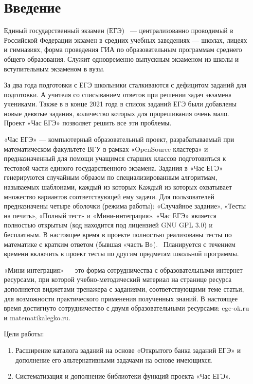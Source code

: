 
\section*{Введение}
Единый государственный экзамен (ЕГЭ)~\cite{ege} --- централизованно проводимый в Российской 
Федерации экзамен в средних учебных заведениях — школах, лицеях и гимназиях,
форма проведения ГИА по образовательным программам среднего общего образования.
Служит одновременно выпускным экзаменом из школы и вступительным экзаменом в вузы.

За два года подготовки с ЕГЭ школьники сталкиваются с дефицитом заданий для подготовки.
А учителя со списыванием ответов при решении задач экзамена учениками. 
Также в в конце 2021 года в список заданий ЕГЭ были добавлены новые девятые задания, 
количество которых для прорешивания очень мало. 
Проект «Час ЕГЭ» позволяет решить все эти проблемы.

«Час ЕГЭ» — компьютерный образовательный проект, разрабатываемый при математическом 
факультете ВГУ в рамках «OpenSource кластера» и предназначенный для помощи учащимся 
старших классов подготовиться к тестовой части единого государственного экзамена.
Задания в «Час ЕГЭ» генерируются случайным образом по специализированным алгоритмам, 
называемых шаблонами, каждый из которых
Каждый из которых охватывает множество вариантов соответствующей ему задачи. Для 
пользователей 
предназначены четыре оболочки (режима работы): «Случайное задание», «Тесты на печать», 
«Полный тест» и «Мини-интеграция».
«Час ЕГЭ» является полностью открытым (код находится под лицензией GNU GPL 3.0) 
и бесплатным.
В настоящее время в проекте полностью реализованы тесты по математике с кратким 
ответом (бывшая «часть В»).~\cite{fipi}
Планируется с течением времени включить в проект тесты по другим предметам школьной 
программы.

«Мини-интеграция» — это форма сотрудничества с образовательными интернет-ресурсами, 
при которой учебно-методический материал на странице ресурса дополняется виджетами 
тренажера с заданиями, соответствующими теме статьи, для возможности практического 
применения полученных знаний.
В настоящее время достигнуто сотрудничество с двумя образовательными ресурсами: ege-ok.ru 
и matematikalegko.ru.

Цели работы:
\begin{enumerate}
    \item Расширение каталога заданий на основе «Открытого банка заданий ЕГЭ» и дополнение его альтернативными задачами на основе имеющихся.
    \item Систематизация и дополнение библиотеки функций проекта «Час ЕГЭ».
\end{enumerate}
